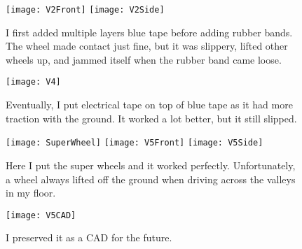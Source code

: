\begin{figure}[h]
    \centering
    \texttt{[image: V2Front]}
    \texttt{[image: V2Side]}
    \caption{
        I first added multiple layers blue tape before adding rubber bands. The wheel made contact just fine, but it was slippery, lifted other wheels up, and jammed itself when the rubber band came loose.
    }
\end{figure}

\begin{figure}[h]
    \centering
    \texttt{[image: V4]}
    \caption{
        Eventually, I put electrical tape on top of blue tape as it had more traction with the ground. It worked a lot better, but it still slipped.
    }
\end{figure}

\begin{figure}[h]
    \centering
    \texttt{[image: SuperWheel]}
    \texttt{[image: V5Front]}
    \texttt{[image: V5Side]}
    \caption{
        Here I put the super wheels and it worked perfectly. Unfortunately, a wheel always lifted off the ground when driving across the valleys in my floor.
    }
\end{figure}


\begin{figure}[h]
    \centering
    \texttt{[image: V5CAD]}
    \caption{
        I preserved it as a CAD for the future.
    }
\end{figure}
